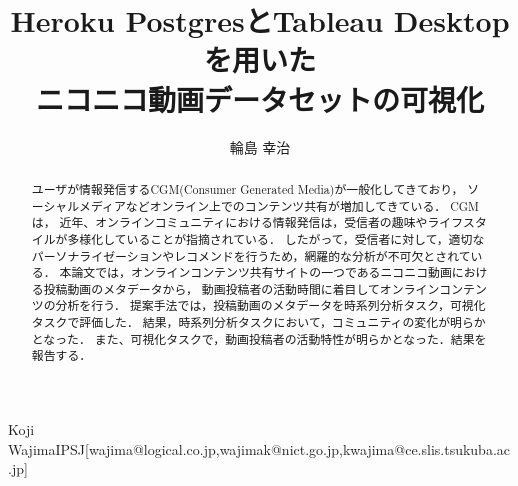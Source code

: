 \documentclass[submit,techrep,noauthor]{ipsj}
\begin{document}
\title{Heroku PostgresとTableau Desktopを用いた\\ニコニコ動画データセットの可視化}




\author{輪島 幸治}{Koji Wajima}{IPSJ}[wajima@logical.co.jp,wajimak@nict.go.jp,kwajima@ce.slis.tsukuba.ac.jp]

\begin{abstract}
ユーザが情報発信するCGM(Consumer Generated Media)が一般化してきており，
ソーシャルメディアなどオンライン上でのコンテンツ共有が増加してきている． 
%
CGMは，
近年、オンラインコミュニティにおける情報発信は，受信者の趣味やライフスタイルが多様化していることが指摘されている．
%
したがって，受信者に対して，適切なパーソナライゼーションやレコメンドを行うため，網羅的な分析が不可欠とされている． 
本論文では，オンラインコンテンツ共有サイトの一つであるニコニコ動画における投稿動画のメタデータから， 
動画投稿者の活動時間に着目してオンラインコンテンツの分析を行う． 
%
提案手法では，投稿動画のメタデータを時系列分析タスク，可視化タスクで評価した． 
結果，時系列分析タスクにおいて，コミュニティの変化が明らかとなった．
また、可視化タスクで，動画投稿者の活動特性が明らかとなった．結果を報告する．
\end{abstract}


%
%
%
\end{document}
